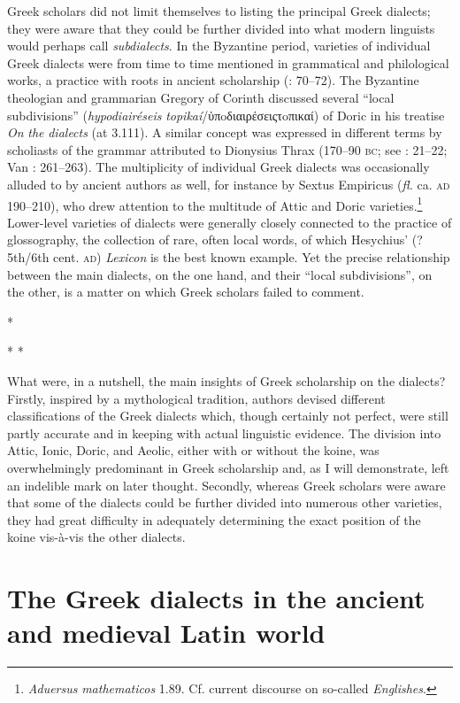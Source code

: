 Greek scholars did not limit themselves to listing the principal Greek dialects; they were aware that they could be further divided into what modern linguists would perhaps call \textit{subdialects}. In the Byzantine period, varieties of individual Greek dialects were from time to time mentioned in grammatical and philological works, a practice with roots in ancient scholarship (\citealt{Hainsworth1964}: 70–72). The Byzantine theologian and grammarian Gregory of Corinth discussed several “local subdivisions” (\textit{hypodiairéseis} \textit{topikaí}/ὑπoδιαιρέσειςτoπικαί) of Doric in his treatise \textit{On} \textit{the} \textit{dialects} (at 3.111). A similar concept was expressed in different terms by scholiasts of the grammar attributed to Dionysius Thrax (170–90 \textsc{bc}; see \citealt{Lambert2009}: 21–22; Van \citealt{Rooy2016d}: 261–263). The multiplicity of individual Greek dialects was occasionally alluded to by ancient authors as well, for instance by Sextus Empiricus (\textit{fl.} ca. \textsc{ad} 190–210), who drew attention to the multitude of Attic and Doric varieties.\footnote{\textit{Aduersus} \textit{mathematicos} 1.89. Cf. current discourse on so-called \textit{Englishes}.} Lower-level varieties of dialects were generally closely connected to the practice of glossography, the collection of rare, often local words, of which Hesychius’ (?5th/6th cent. \textsc{ad}) \textit{Lexicon} is the best known example. Yet the precise relationship between the main dialects, on the one hand, and their “local subdivisions”, on the other, is a matter on which Greek scholars failed to comment.

*

*  *

What were, in a nutshell, the main insights of Greek scholarship on the dialects? Firstly, inspired by a mythological tradition, authors devised different classifications of the Greek dialects which, though certainly not perfect, were still partly accurate and in keeping with actual linguistic evidence. The division into Attic, Ionic, Doric, and Aeolic, either with or without the koine, was overwhelmingly predominant in Greek scholarship and, as I will demonstrate, left an indelible mark on later thought. Secondly, whereas Greek scholars were aware that some of the dialects could be further divided into numerous other varieties, they had great difficulty in adequately determining the exact position of the koine vis-à-vis the other dialects.

\section{The Greek dialects in the ancient and medieval Latin world}

